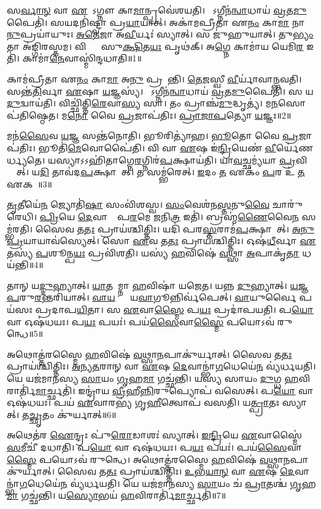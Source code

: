 𑌸\ul{𑌰𑍍𑌵𑌾}\ul{𑌨𑍍} 𑌵𑌾 \ul{𑌏}𑌷𑍋᳚\-𑌽𑌗𑍍𑌨𑍗 𑌕𑌾\ul{𑌮𑌾}𑌨𑍍𑌪𑍍𑌰𑌵𑍇॑𑌶𑌯𑌤𑌿।
𑌯𑍋᳚𑌽𑌗𑍍𑌨𑍀𑌨॑\ul{𑌨𑍍𑌵𑌾}𑌧𑌾𑌯॑ \ul{𑌵𑍍𑌰}𑌤\ul{𑌮𑍁}𑌪𑍈𑌤𑌿॑।
𑌸𑌯𑌦𑌨𑌿॑𑌷𑍍𑌟𑍍𑌵𑌾 𑌪𑍍𑌰\ul{𑌯𑌾}𑌯𑌾𑌤𑍍।
𑌅𑌕𑌾॑𑌮𑌪𑍍𑌰𑍀𑌤𑌾 𑌏\ul{𑌨𑌂} 𑌕𑌾\ul{𑌮𑌾} 𑌨𑌾\ul{𑌨𑍁}𑌪𑍍𑌰𑌯𑌾॑𑌯𑍁𑌃।
\ul{𑌅}\ul{𑌤𑍇}𑌜𑌾 𑌅॑\ul{𑌵𑍀}𑌰𑍍𑌯𑌃॑ 𑌸𑍍𑌯𑌾𑌤𑍍।
𑌸 𑌜𑍁॑𑌹𑍁𑌯𑌾𑌤𑍍।
𑌤𑍁\ul{𑌭𑍍𑌯𑌂} 𑌤𑌾 𑌅॑𑌙𑍍𑌗𑌿𑌰𑌸𑍍𑌤𑌮।
𑌵𑌿𑌶𑍍𑌵𑌾𑌃᳚ 𑌸𑍁\ul{𑌕𑍍𑌷𑌿}𑌤\ul{𑌯𑌃} 𑌪𑍃𑌥॑𑌕𑍍।
𑌅\ul{𑌗𑍍𑌨𑍇} 𑌕𑌾𑌮𑌾॑𑌯 𑌯𑍇𑌮𑌿\ul{𑌰} 𑌇𑌤𑌿॑।
𑌕𑌾𑌮𑌾॑\ul{𑌨𑍇}𑌵𑌾𑌸𑍍𑌮𑌿॑𑌨𑍍𑌦𑌧𑌾𑌤𑌿॥1॥

𑌕𑌾𑌮॑𑌪𑍍𑌰𑍀𑌤𑌾 𑌏\ul{𑌨𑌂} 𑌕𑌾\ul{𑌮𑌾} 𑌅\ul{𑌨𑍁} 𑌪𑍍𑌰𑌯𑌾᳚𑌨𑍍𑌤𑌿।
\ul{𑌤𑍇}\ul{𑌜}𑌸𑍍𑌵𑍀 \ul{𑌵𑍀}𑌰𑍍𑌯𑌾॑𑌵𑌾𑌨𑍍𑌭𑌵𑌤𑌿।
𑌸𑌨𑍍𑌤॑\ul{𑌤𑌿}𑌰𑍍𑌵𑌾 \ul{𑌏}𑌷𑌾 \ul{𑌯}𑌜𑍍𑌞𑌸𑍍𑌯॑।
𑌯𑍋᳚𑌽𑌗𑍍𑌨𑍀𑌨॑\ul{𑌨𑍍𑌵𑌾}𑌧𑌾𑌯॑ \ul{𑌵𑍍𑌰}𑌤\ul{𑌮𑍁}𑌪𑍈𑌤𑌿॑।
𑌸 𑌯\ul{𑌦𑍁}𑌦𑍍𑌵𑌾𑌯॑𑌤𑌿।
𑌵𑌿𑌚𑍍𑌛𑌿॑𑌤𑍍𑌤𑌿\ul{𑌰𑍇}𑌵𑌾\ul{𑌸𑍍𑌯} 𑌸𑌾।
𑌤𑌂 𑌪𑍍𑌰𑌾𑌞𑍍𑌚॑\ul{𑌮𑍁}𑌦𑍍𑌧𑍃𑌤𑍍𑌯॑।
𑌮\ul{𑌨}𑌸𑍋𑌪॑𑌤𑌿𑌷𑍍𑌠𑍇𑌤।
𑌮\ul{𑌨𑍋} 𑌵𑍈 \ul{𑌪𑍍𑌰}𑌜𑌾𑌪॑𑌤𑌿𑌃।
\ul{𑌪𑍍𑌰𑌾}\ul{𑌜𑌾}\ul{𑌪}𑌤𑍍𑌯𑍋 \ul{𑌯}𑌜𑍍𑌞𑌃॥2॥

𑌮𑌨॑\ul{𑌸𑍈}𑌵 \ul{𑌯}𑌜𑍍𑌞 𑌸𑌨𑍍𑌤॑𑌨𑍋𑌤𑌿।
𑌭𑍂𑌰𑌿𑌤𑍍𑌯𑌾॑𑌹।
\ul{𑌭𑍂}𑌤𑍋 𑌵𑍈 \ul{𑌪𑍍𑌰}𑌜𑌾𑌪॑𑌤𑌿𑌃।
𑌭𑍂𑌤𑌿॑\ul{𑌮𑍇}𑌵𑍋𑌪𑍈॑𑌤𑌿।
𑌵𑌿 𑌵𑌾 \ul{𑌏}𑌷 𑌇॑\ul{𑌨𑍍𑌦𑍍𑌰𑌿}𑌯𑍇𑌣॑ \ul{𑌵𑍀}𑌰𑍍𑌯𑍇॑𑌣𑌰𑍍𑌧𑍍𑌯𑌤𑍇।
𑌯𑌸𑍍𑌯𑌾𑌽𑌽𑌹𑌿॑𑌤𑌾𑌗𑍍𑌨𑍇\ul{𑌰}𑌗𑍍𑌨𑌿𑌰॑\ul{𑌪}𑌕𑍍𑌷𑌾𑌯॑𑌤𑌿।
𑌯𑌾\ul{𑌵}𑌚𑍍𑌛𑌮𑍍𑌯॑𑌯𑌾 \ul{𑌪𑍍𑌰}𑌵𑌿𑌧𑍍𑌯𑍇᳚𑌤𑍍।
𑌯\ul{𑌦𑌿} 𑌤𑌾𑌵॑𑌦\ul{𑌪}𑌕𑍍𑌷𑌾𑌯𑍇᳚𑌤𑍍।
𑌤 𑌸𑌮𑍍𑌭॑𑌰𑍇𑌤𑍍।
\ul{𑌇}𑌦𑌂 \ul{𑌤} 𑌏𑌕𑌂॑ \ul{𑌪}𑌰 𑌉॑ \ul{𑌤} 𑌏𑌕𑌮𑍍᳚॥3॥

\ul{𑌤𑍃}𑌤𑍀𑌯𑍇॑\ul{𑌨} 𑌜𑍍𑌯𑍋𑌤𑌿॑\ul{𑌷𑌾} 𑌸𑌂𑌵𑌿॑𑌶𑌸𑍍𑌵।
\ul{𑌸𑌂}𑌵𑍇𑌶॑𑌨\ul{𑌸𑍍𑌤}𑌨𑍁\ul{𑌵𑍈} 𑌚𑌾𑌰𑍁॑𑌰𑍇𑌧𑌿।
\ul{𑌪𑍍𑌰𑌿}𑌯𑍇 \ul{𑌦𑍇}𑌵𑌾𑌨𑌾𑌂᳚ 𑌪\ul{𑌰}𑌮𑍇 \ul{𑌜}𑌨𑌿\ul{𑌤𑍍𑌰} 𑌇𑌤𑌿॑।
𑌬𑍍𑌰𑌹𑍍𑌮॑\ul{𑌣𑍈}𑌵𑍈\ul{𑌨}\ul{} 𑌸𑌮𑍍𑌭॑𑌰𑌤𑌿।
𑌸𑍈𑌵 𑌤\ul{𑌤𑌃} 𑌪𑍍𑌰𑌾𑌯॑𑌶𑍍𑌚𑌿𑌤𑍍𑌤𑌿𑌃।
𑌯𑌦𑌿॑ 𑌪𑌰\ul{𑌸𑍍𑌤}𑌰𑌾𑌮॑\ul{𑌪}𑌕𑍍𑌷𑌾𑌯𑍇᳚𑌤𑍍।
\ul{𑌅}\ul{𑌨𑍁}\ul{𑌪𑍍𑌰}𑌯𑌾𑌯𑌾𑌵॑𑌸𑍍𑌯𑍇𑌤𑍍।
𑌸𑍋 \ul{𑌏}𑌵 𑌤\ul{𑌤𑌃} 𑌪𑍍𑌰𑌾𑌯॑𑌶𑍍𑌚𑌿𑌤𑍍𑌤𑌿𑌃।
𑌓𑌷॑\ul{𑌧𑍀}𑌰𑍍𑌵𑌾 \ul{𑌏}𑌤𑌸𑍍𑌯॑ \ul{𑌪}𑌶𑍂𑌨𑍍𑌪\ul{𑌯𑌃} 𑌪𑍍𑌰𑌵𑌿॑𑌶𑌤𑌿।
𑌯𑌸𑍍𑌯॑ \ul{𑌹}𑌵𑌿𑌷𑍇॑ \ul{𑌵}𑌥𑍍𑌸𑌾 \ul{𑌅}𑌪𑌾𑌕𑍃॑\ul{𑌤𑌾} 𑌧𑌯॑𑌨𑍍𑌤𑌿॥4॥

𑌤𑌾𑌨𑍍 𑌯\ul{𑌦𑍍𑌦𑍁}𑌹𑍍𑌯𑌾𑌤𑍍।
\ul{𑌯𑌾}𑌤𑌯𑌾᳚𑌮𑍍𑌨𑌾 \ul{𑌹}𑌵𑌿𑌷𑌾॑ 𑌯𑌜𑍇𑌤।
𑌯𑌨𑍍𑌨 \ul{𑌦𑍁}𑌹𑍍𑌯𑌾𑌤𑍍।
\ul{𑌯}\ul{𑌜𑍍𑌞}\ul{𑌪}𑌰𑍁\ul{𑌰}𑌨𑍍𑌤𑌰𑌿॑𑌯𑌾𑌤𑍍।
\ul{𑌵𑌾}\ul{𑌯}𑌵𑍍𑌯𑌾𑌂᳚ 𑌯\ul{𑌵𑌾}𑌗𑍂𑌨𑍍𑌨𑌿𑌰𑍍𑌵॑𑌪𑍇𑌤𑍍।
\ul{𑌵𑌾}𑌯𑍁𑌰𑍍𑌵𑍈 𑌪𑌯॑𑌸𑌃 𑌪𑍍𑌰𑌦𑌾𑌪\ul{𑌯𑌿}𑌤𑌾।
𑌸 \ul{𑌏}𑌵𑌾\ul{𑌸𑍍𑌮𑍈} 𑌪\ul{𑌯𑌃} 𑌪𑍍𑌰𑌦𑌾॑𑌪𑌯𑌤𑌿।
𑌪\ul{𑌯𑍋} 𑌵𑌾 𑌓𑌷॑𑌧𑌯𑌃।
𑌪\ul{𑌯𑌃} 𑌪𑌯𑌃॑।
𑌪𑌯॑\ul{𑌸𑍈}𑌵𑌾\ul{𑌸𑍍𑌮𑍈} 𑌪𑌯𑍋\-𑌽𑌵॑ 𑌰𑍁𑌨𑍍𑌧𑍇॥5॥

𑌅𑌥𑍋𑌤𑍍𑌤॑𑌰𑌸𑍍𑌮𑍈 \ul{𑌹}𑌵𑌿𑌷𑍇॑ \ul{𑌵}𑌥𑍍𑌸𑌾\ul{𑌨}𑌪𑌾𑌕𑍁॑𑌰𑍍𑌯𑌾𑌤𑍍।
𑌸𑍈𑌵 𑌤\ul{𑌤𑌃} 𑌪𑍍𑌰𑌾𑌯॑𑌶𑍍𑌚𑌿𑌤𑍍𑌤𑌿𑌃।
\ul{𑌅}\ul{𑌨𑍍𑌯}\ul{𑌤}𑌰𑌾𑌨𑍍 𑌵𑌾 \ul{𑌏}𑌷 \ul{𑌦𑍇}𑌵𑌾𑌨𑍍𑌭𑌾॑\ul{𑌗}𑌧𑍇𑌯𑍇॑\ul{𑌨} 𑌵𑍍𑌯॑𑌰𑍍𑌧𑌯𑌤𑌿।
𑌯𑍇 𑌯𑌜॑𑌮𑌾𑌨𑌸𑍍𑌯 \ul{𑌸𑌾}𑌯𑌂 \ul{𑌗𑍃}𑌹\ul{𑌮𑌾} 𑌗𑌚𑍍𑌛॑𑌨𑍍𑌤𑌿।
𑌯𑌸𑍍𑌯॑ 𑌸𑌾𑌯𑌂 \ul{𑌦𑍁}𑌗𑍍𑌧 \ul{𑌹}𑌵𑌿𑌰𑌾𑌰𑍍𑌤𑌿॑\ul{𑌮𑌾}𑌰𑍍𑌚𑍍𑌛𑌤𑌿॑।
𑌇𑌨𑍍𑌦𑍍𑌰𑌾॑𑌯 \ul{𑌵𑍍𑌰𑍀}𑌹𑍀\ul{𑌨𑍍𑌨𑌿}𑌰𑍁𑌪𑍍𑌯𑍋𑌪॑ 𑌵𑌸𑍇𑌤𑍍।
𑌪\ul{𑌯𑍋} 𑌵𑌾 𑌓𑌷॑𑌧𑌯𑌃।
𑌪𑌯॑ \ul{𑌏}𑌵𑌾𑌰𑌭𑍍𑌯॑ 𑌗𑍃\ul{𑌹𑍀}𑌤𑍍𑌵𑍋𑌪॑ 𑌵𑌸𑌤𑌿।
𑌯\ul{𑌤𑍍𑌪𑍍𑌰𑌾}𑌤𑌃 𑌸𑍍𑌯𑌾𑌤𑍍।
𑌤\ul{𑌚𑍍𑌛𑍃}𑌤𑌂 𑌕𑍁॑𑌰𑍍𑌯𑌾𑌤𑍍॥6॥

𑌅𑌥𑍇𑌤॑𑌰 \ul{𑌐}𑌨𑍍𑌦𑍍𑌰𑌃 𑌪𑍁॑\ul{𑌰𑍋}𑌡𑌾𑌶𑌃॑ 𑌸𑍍𑌯𑌾𑌤𑍍।
\ul{𑌇}\ul{𑌨𑍍𑌦𑍍𑌰𑌿}𑌯𑍇 \ul{𑌏}𑌵𑌾𑌸𑍍𑌮𑍈॑ \ul{𑌸}𑌮𑍀𑌚𑍀॑ 𑌦𑌧𑌾𑌤𑌿।
𑌪\ul{𑌯𑍋} 𑌵𑌾 𑌓𑌷॑𑌧𑌯𑌃।
𑌪\ul{𑌯𑌃} 𑌪𑌯𑌃॑।
𑌪𑌯॑\ul{𑌸𑍈}𑌵𑌾\ul{𑌸𑍍𑌮𑍈} 𑌪𑌯𑍋\-𑌽𑌵॑ 𑌰𑍁𑌨𑍍𑌧𑍇।
𑌅𑌥𑍋𑌤𑍍𑌤॑𑌰𑌸𑍍𑌮𑍈 \ul{𑌹}𑌵𑌿𑌷𑍇॑ \ul{𑌵}𑌥𑍍𑌸𑌾\ul{𑌨}𑌪𑌾𑌕𑍁॑𑌰𑍍𑌯𑌾𑌤𑍍।
𑌸𑍈𑌵 𑌤\ul{𑌤𑌃} 𑌪𑍍𑌰𑌾𑌯॑𑌶𑍍𑌚𑌿𑌤𑍍𑌤𑌿𑌃।
\ul{𑌉}𑌭\ul{𑌯𑌾}\ul{𑌨𑍍} 𑌵𑌾 \ul{𑌏}𑌷 \ul{𑌦𑍇}𑌵𑌾𑌨𑍍𑌭𑌾॑\ul{𑌗}𑌧𑍇𑌯𑍇॑\ul{𑌨} 𑌵𑍍𑌯॑𑌰𑍍𑌧𑌯𑌤𑌿।
𑌯𑍇 𑌯𑌜॑𑌮𑌾𑌨𑌸𑍍𑌯 \ul{𑌸𑌾}𑌯𑌂 𑌚॑ \ul{𑌪𑍍𑌰𑌾}𑌤𑌶𑍍𑌚॑ \ul{𑌗𑍃}𑌹\ul{𑌮𑌾} 𑌗𑌚𑍍𑌛॑𑌨𑍍𑌤𑌿।
𑌯\ul{𑌸𑍍𑌯𑍋}𑌭𑌯॑ \ul{𑌹}𑌵𑌿𑌰𑌾𑌰𑍍𑌤𑌿॑\ul{𑌮𑌾}𑌰𑍍𑌚𑍍𑌛𑌤𑌿॑॥7॥

